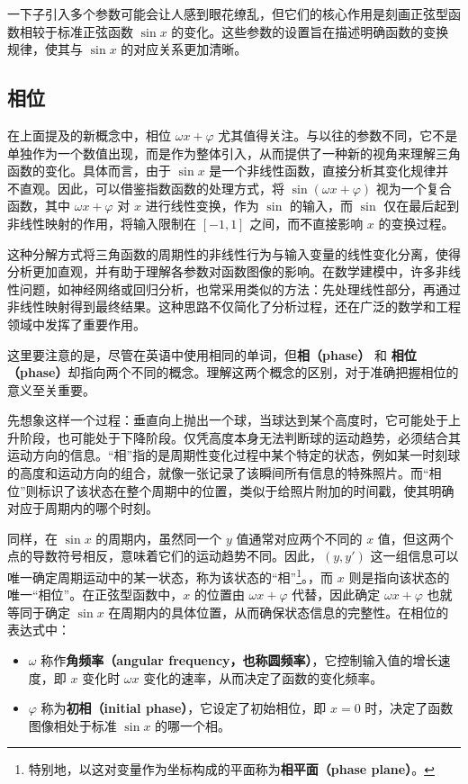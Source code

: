 一下子引入多个参数可能会让人感到眼花缭乱，但它们的核心作用是刻画正弦型函数相较于标准正弦函数 $\sin x$ 的变化。这些参数的设置旨在描述明确函数的变换规律，使其与 $\sin x$ 的对应关系更加清晰。

\subsection{相位}

在上面提及的新概念中，相位 $\omega x + \varphi$ 尤其值得关注。与以往的参数不同，它不是单独作为一个数值出现，而是作为整体引入，从而提供了一种新的视角来理解三角函数的变化。具体而言，由于 $\sin x$ 是一个非线性函数，直接分析其变化规律并不直观。因此，可以借鉴指数函数的处理方式，将 $\sin(\omega x + \varphi)$ 视为一个复合函数，其中 $\omega x + \varphi$ 对 $x$ 进行线性变换，作为 $\sin$ 的输入，而 $\sin$ 仅在最后起到非线性映射的作用，将输入限制在 $[-1,1]$ 之间，而不直接影响 $x$ 的变换过程。

这种分解方式将三角函数的周期性的非线性行为与输入变量的线性变化分离，使得分析更加直观，并有助于理解各参数对函数图像的影响。在数学建模中，许多非线性问题，如神经网络或回归分析，也常采用类似的方法：先处理线性部分，再通过非线性映射得到最终结果。这种思路不仅简化了分析过程，还在广泛的数学和工程领域中发挥了重要作用。

这里要注意的是，尽管在英语中使用相同的单词，但\textbf{相（phase）} 和 \textbf{相位（phase）}却指向两个不同的概念。理解这两个概念的区别，对于准确把握相位的意义至关重要。

先想象这样一个过程：垂直向上抛出一个球，当球达到某个高度时，它可能处于上升阶段，也可能处于下降阶段。仅凭高度本身无法判断球的运动趋势，必须结合其运动方向的信息。“相”指的是周期性变化过程中某个特定的状态，例如某一时刻球的高度和运动方向的组合，就像一张记录了该瞬间所有信息的特殊照片。而“相位”则标识了该状态在整个周期中的位置，类似于给照片附加的时间戳，使其明确对应于周期内的哪个时刻。

同样，在 $\sin x$ 的周期内，虽然同一个 $y$ 值通常对应两个不同的 $x$ 值，但这两个点的导数符号相反，意味着它们的运动趋势不同。因此，$(y, y')$ 这一组信息可以唯一确定周期运动中的某一状态，称为该状态的“相”\footnote{特别地，以这对变量作为坐标构成的平面称为\textbf{相平面（phase plane）}。}。，而 $x$ 则是指向该状态的唯一“相位”。在正弦型函数中，$x$ 的位置由 $\omega x + \varphi$ 代替，因此确定 $\omega x + \varphi$ 也就等同于确定 $\sin x$ 在周期内的具体位置，从而确保状态信息的完整性。在相位的表达式中：
\begin{itemize}
\item $\omega$ 称作\textbf{角频率（angular frequency，也称圆频率）}，它控制输入值的增长速度，即 $x$ 变化时 $\omega x$ 变化的速率，从而决定了函数的变化频率。
\item $\varphi$ 称为\textbf{初相（initial phase）}，它设定了初始相位，即 $x=0$ 时，决定了函数图像相处于标准 $\sin x$ 的哪一个相。
\end{itemize}


